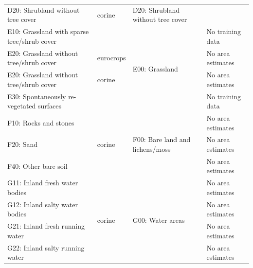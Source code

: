 \begin{table}[]
{\begin{tabular}{llll}
D20: Shrubland without tree cover             & corine                  & D20: Shrubland without tree cover                     &                                                           \\
E10: Grassland with sparse tree/shrub cover   &                         & \multirow{4}{*}{E00: Grassland}                       & No training data                                          \\
E20: Grassland without tree/shrub cover       & eurocrops               &                                                       & No area estimates                                         \\
E20: Grassland without tree/shrub cover       & corine                  &                                                       & No area estimates                                         \\
E30: Spontaneously re-vegetated surfaces      &                         &                                                       & No training data                                          \\
F10: Rocks and stones                         & \multirow{3}{*}{corine} & \multirow{3}{*}{F00: Bare land and lichens/moss}      & No area estimates                                         \\
F20: Sand                                     &                         &                                                       & No area estimates                                         \\
F40: Other bare soil                          &                         &                                                       & No area estimates                                         \\
G11: Inland fresh water bodies                & \multirow{8}{*}{corine} & \multirow{8}{*}{G00: Water areas}                     & No area estimates                                         \\
G12: Inland salty water bodies                &                         &                                                       & No area estimates                                         \\
G21: Inland fresh running water               &                         &                                                       & No area estimates                                         \\
G22: Inland salty running water               &                         &                                                       & No area estimates                                         \\

\end{tabular}}
\end{table}
